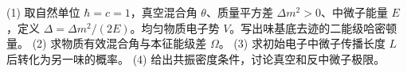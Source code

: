 (1) 取自然单位 \(\hbar=c=1\)，真空混合角 \(\theta\)、质量平方差 \(\Delta m^2>0\)、中微子能量 \(E\)，定义 \(\Delta=\Delta m^2/(2E)\)。均匀物质电子势 \(V\)。写出味基底去迹的二能级哈密顿量。
(2) 求物质有效混合角与本征能级差 \(\Omega\)。
(3) 求初始电子中微子传播长度 \(L\) 后转化为另一味的概率。
(4) 给出共振密度条件，讨论真空和反中微子极限。

